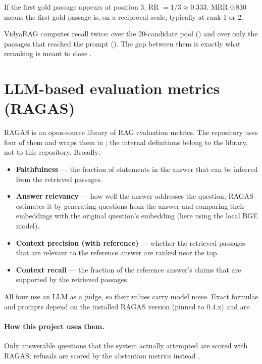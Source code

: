 \begin{example}
If the first gold passage appears at position 3, RR $=1/3\approx0.333$. MRR 0.830 means the first gold passage is, on a reciprocal scale, typically at rank 1 or 2.
\end{example}

VidyaRAG computes recall twice: over the 20-candidate pool () and over only the passages that reached the prompt (). The gap between them is exactly what reranking is meant to close .

\section{LLM-based evaluation metrics (RAGAS)}
\label{sec:ragas-concepts}

\begin{background}
RAGAS is an open-source library of RAG evaluation metrics. The repository uses four of them and wraps them in ; the internal definitions belong to the library, not to this repository. Broadly:
\begin{itemize}
  \item \textbf{Faithfulness} --- the fraction of statements in the answer that can be inferred from the retrieved passages.
  \item \textbf{Answer relevancy} --- how well the answer addresses the question; RAGAS estimates it by generating questions from the answer and comparing their embeddings with the original question's embedding (here using the local BGE model).
  \item \textbf{Context precision (with reference)} --- whether the retrieved passages that are relevant to the reference answer are ranked near the top.
  \item \textbf{Context recall} --- the fraction of the reference answer's claims that are supported by the retrieved passages.
\end{itemize}
All four use an LLM as a judge, so their values carry model noise. Exact formulas and prompts depend on the installed RAGAS version (pinned to 0.4.x) and are \NotDet
\end{background}

\paragraph{How this project uses them.} Only answerable questions that the system actually attempted are scored with RAGAS; refusals are scored by the abstention metrics instead .

